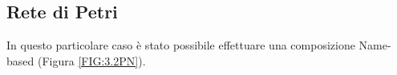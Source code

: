 \documentclass[a4paper]{article}
\begin{document}
\subsection{Rete di Petri}
In questo particolare caso è stato possibile effettuare una composizione Name-based (Figura \ref{FIG:3.2PN}).
\begin{figure}[!ht]
\centering
{}
\end{figure}
\end{document}
